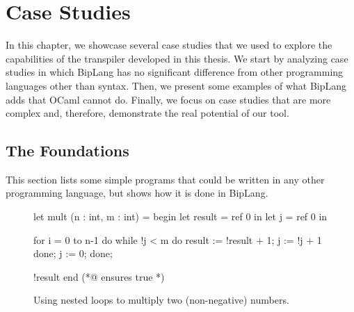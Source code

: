 
%


\chapter{Case Studies}
\label{cha:case_studies}

In this chapter, we showcase several case studies that we used to explore the capabilities of the transpiler developed in this thesis.
We start by analyzing case studies in which BipLang has no significant difference from other programming languages other than syntax.
Then, we present some examples of what BipLang adds that OCaml cannot do.
Finally, we focus on case studies that are more complex and, therefore, demonstrate the real potential of our tool.


\section{The Foundations}
\label{sec:foundations}

This section lists some simple programs that could be written in any other programming language, but shows how it is done in BipLang.

\begin{figure}
\begin{minipage}{\linewidth}
\begin{biplangenv}
  let mult (n : int, m : int) = begin
    let result = ref 0 in
    let j = ref 0 in

    for i = 0 to n-1 do
      while !j < m do
        result := !result + 1;
        j := !j + 1
      done;
      j := 0;
    done;
    
    !result
  end
  (*@ ensures true *)
\end{biplangenv}
\end{minipage}
\caption{Using nested loops to multiply two (non-negative) numbers.}
\end{figure}

